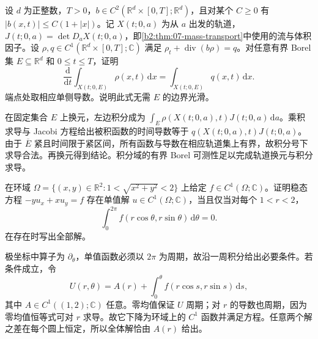 \begin{exercise}\label{b2:ex:07-moving-source}
设 \(d\) 为正整数，\(T>0\)，\(b\in C^2(\mathbb R^d\times[0,T];\mathbb R^d)\)，且对某个 \(C\geq0\) 有 \(|b(x,t)|\leq C(1+|x|)\)。记 \(X(t;0,a)\) 为从 \(a\) 出发的轨道，\(J(t;0,a)=\det D_aX(t;0,a)\)，即\cref{b2:thm:07-mass-transport}中使用的流与体积因子。设 \(\rho,q\in C^1(\mathbb R^d\times[0,T];\mathbb C)\) 满足 \(\rho_t+\operatorname{div}(b\rho)=q\)。对任意有界 Borel 集 \(E\subseteq\mathbb R^d\) 和 \(0\leq t\leq T\)，证明
\[
 \frac{\mathrm d}{\mathrm dt}\int_{X(t;0,E)}\rho(x,t)\,\mathrm dx
 =\int_{X(t;0,E)}q(x,t)\,\mathrm dx.
\]
端点处取相应单侧导数。说明此式无需 \(E\) 的边界光滑。
\end{exercise}
\begin{solution}
在固定集合 \(E\) 上换元，左边积分成为 \(\int_E\rho(X(t;0,a),t)J(t;0,a)\,\mathrm da\)。乘积求导与 Jacobi 方程给出被积函数的时间导数等于 \(q(X(t;0,a),t)J(t;0,a)\)。由于 \(\overline E\) 紧且时间限于紧区间，所有函数与导数在相应轨道集上有界，故积分号下求导合法。再换元得到结论。积分域的有界 Borel 可测性足以完成轨道换元与积分求导。
\end{solution}

\begin{exercise}\label{b2:ex:07-closed-orbits}
在环域 \(\Omega=\{(x,y)\in\mathbb R^2:1<\sqrt{x^2+y^2}<2\}\) 上给定 \(f\in C^1(\Omega;\mathbb C)\)。证明稳态方程 \(-yu_x+xu_y=f\) 存在单值解 \(u\in C^1(\Omega;\mathbb C)\)，当且仅当对每个 \(1<r<2\)，
\[
 \int_0^{2\pi}f(r\cos\theta,r\sin\theta)\,\mathrm d\theta=0.
\]
在存在时写出全部解。
\end{exercise}
\begin{solution}
极坐标中算子为 \(\partial_\theta\)，单值函数必须以 \(2\pi\) 为周期，故沿一周积分给出必要条件。若条件成立，令
\[
 U(r,\theta)=A(r)+\int_0^\theta f(r\cos s,r\sin s)\,\mathrm ds,
\]
其中 \(A\in C^1((1,2);\mathbb C)\) 任意。零均值保证 \(U\) 周期；对 \(r\) 的导数也周期，因为零均值恒等式可对 \(r\) 求导。故它下降为环域上的 \(C^1\) 函数并满足方程。任意两个解之差在每个圆上恒定，所以全体解恰由 \(A(r)\) 给出。
\end{solution}

